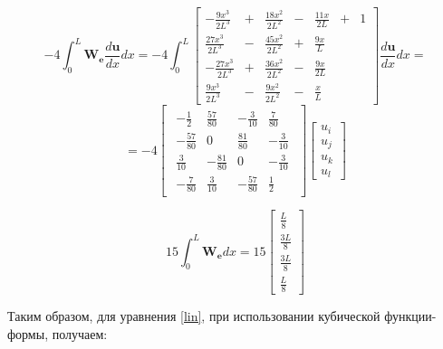 $$
 -4   \int_0^L \mathbf{W_e} \frac{d \mathbf{u}}{dx} dx
=
 -4  \int_0^L
\begin{bmatrix}
  -\frac{9x^3}{2L^3}&+&\frac{18x^2}{2L^2}&-&\frac{11x}{2L} &+& 1\\
  \frac{27x^3}{2L^3}&-&\frac{45x^2}{2L^2}&+&\frac{9x}{L}&&\\
  -\frac{27x^3}{2L^3}&+&\frac{36x^2}{2L^2}&-&\frac{9x}{2L}&&\\
  \frac{9x^3}{2L^3}&-&\frac{9x^2}{2L^2}&-&\frac{x}{L}&&
\end{bmatrix}
\frac{d \mathbf{u}}{dx} dx
=
$$
$$
=
 -4  
\begin{bmatrix}
\begin{array}{rrrr}
	-\frac{1}{2} & \frac{57}{80} & -\frac{3}{10} & \frac{7}{80}\\
	-\frac{57}{80} & 0 & \frac{81}{80} & -\frac{3}{10} \\
	\frac{3}{10} & -\frac{81}{80} & 0 & -\frac{3}{10}\\
	-\frac{7}{80} & \frac{3}{10} & -\frac{57}{80} & \frac{1}{2}
\end{array}
\end{bmatrix}
\begin{bmatrix}
	u_i \\
	u_j \\
	u_k\\
	u_l
\end{bmatrix}
$$

$$
15 \int_0^L \mathbf{W_e} d x
=
15
\begin{bmatrix}
	\frac{L}{8} \\
	\frac{3L}{8}\\
	\frac{3L}{8}\\
	\frac{L}{8}
\end{bmatrix}
$$

\newpage
Таким образом, для уравнения \ref{lin}, при использовании кубической функции-формы,  получаем:

